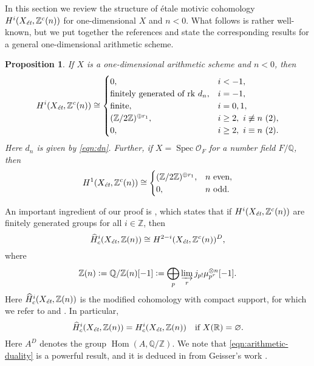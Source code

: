 \documentclass[draft]{article}
\DeclareMathOperator{\Hom}{Hom}
\DeclareMathOperator{\Spec}{Spec}
\newcommand{\QQ}{\mathbb{Q}}
\newcommand{\RR}{\mathbb{R}}
\newcommand{\ZZ}{\mathbb{Z}}
\renewcommand{\emptyset}{\varnothing}
\newcommand{\et}{\text{\it \'{e}t}}
\newcommand{\dfn}{\mathrel{\mathop:}=}
\theoremstyle{myplain}
\newtheorem{proposition}[theorem]{Proposition}
\theoremstyle{mydefinition}
\numberwithin{equation}{section}
\begin{document}
In this section we review the structure of \'{e}tale motivic cohomology
$H^i (X_\et, \ZZ^c(n))$ for one-dimensional $X$ and $n < 0$. What follows is
rather well-known, but we put together the references and state the
corresponding results for a general one-dimensional arithmetic scheme.

\begin{proposition}
  \label{prop:structure-of-motivic-cohomology}
  If $X$ is a one-dimensional arithmetic scheme and $n < 0$, then
  \begin{equation}
    \label{eqn:structure-of-motivic-cohomology}
    H^i (X_\et, \ZZ^c (n)) \cong
    \begin{cases}
      0, & i < -1, \\
      \text{finitely generated of rk } d_n, & i = -1, \\
      \text{finite}, & i = 0,1, \\
      (\ZZ/2\ZZ)^{\oplus r_1}, & i \ge 2, ~ i\not\equiv n ~ (2), \\
      0, & i \ge 2, ~ i\equiv n ~ (2).
    \end{cases}
  \end{equation}
  Here $d_n$ is given by \eqref{eqn:dn}.
  Further, if $X = \Spec \mathcal{O}_F$ for a number field $F/\QQ$, then
  \begin{equation}
    \label{eqn:2-torsion-in-H1-Zc-for-Spec-OF}
    H^1 (X_\et, \ZZ^c (n)) \cong
    \begin{cases}
      (\ZZ/2\ZZ)^{\oplus r_1}, & n\text{ even}, \\
      0, & n \text{ odd}.
    \end{cases}
  \end{equation}
\end{proposition}

An important ingredient of our proof is \cite[Theorem~I]{Beshenov-Weil-etale-1},
which states that if $H^i (X_\et, \ZZ^c (n))$ are finitely generated groups for
all $i \in \ZZ$, then
\begin{equation}
  \label{eqn:arithmetic-duality}
  \widehat{H}^i_c (X_\et, \ZZ (n)) \cong
  H^{2-i} (X_\et, \ZZ^c (n))^D,
\end{equation}
where
\[ \ZZ (n) \dfn \QQ/\ZZ (n) [-1] \dfn
  \bigoplus_p \varinjlim_r j_{p!} \mu_{p^r}^{\otimes n} [-1]. \]
Here $\widehat{H}^i_c (X_\et, \ZZ (n))$ is the modified cohomology with compact
support, for which we refer to \cite[\S 2]{Geisser-Schmidt-2018} and
\cite[Appendix~B]{Beshenov-Weil-etale-1}. In particular,
\[
  \widehat{H}^i_c (X_\et, \ZZ (n)) = H^i_c (X_\et, \ZZ (n))
  \quad
  \text{if }X (\RR) = \emptyset.
\]
Here $A^D$ denotes the group $\Hom (A, \QQ/\ZZ)$. We note that
\eqref{eqn:arithmetic-duality} is a powerful result, and it is deduced in
\cite{Beshenov-Weil-etale-1} from Geisser's work \cite{Geisser-2010}.
\end{document}
